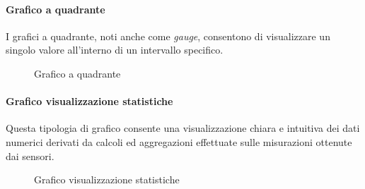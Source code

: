\paragraph{Grafico a quadrante}
\hypertarget{par:grafico_quadrante}{}
I grafici a quadrante, noti anche come \textit{gauge}, consentono di visualizzare un singolo valore all'interno di un intervallo specifico. 

\begin{figure}[H]
    \centering
    \caption{Grafico a quadrante}
    \label{fig:my_label}
\end{figure}


\paragraph{Grafico visualizzazione statistiche}
\hypertarget{par:visu_stat}{}
Questa tipologia di grafico consente una visualizzazione chiara e intuitiva dei dati numerici derivati da calcoli ed aggregazioni effettuate sulle misurazioni ottenute dai sensori. 
\begin{figure}[H]
    \centering
    \caption{Grafico visualizzazione statistiche}
    \label{fig:my_label}
\end{figure}


